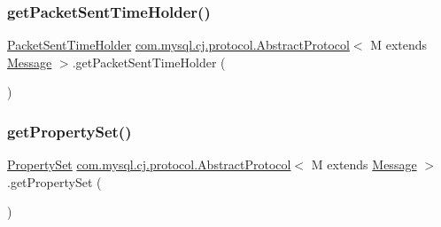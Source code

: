 \mbox{\label{classcom_1_1mysql_1_1cj_1_1protocol_1_1_abstract_protocol_aebcc61f81c539b41f5128d5fe2eee980}} 
\subsubsection{\texorpdfstring{get\+Packet\+Sent\+Time\+Holder()}{getPacketSentTimeHolder()}}
{\footnotesize\ttfamily \mbox{\hyperlink{interfacecom_1_1mysql_1_1cj_1_1protocol_1_1_packet_sent_time_holder}{Packet\+Sent\+Time\+Holder}} \mbox{\hyperlink{classcom_1_1mysql_1_1cj_1_1protocol_1_1_abstract_protocol}{com.\+mysql.\+cj.\+protocol.\+Abstract\+Protocol}}$<$ M extends \mbox{\hyperlink{interfacecom_1_1mysql_1_1cj_1_1protocol_1_1_message}{Message}} $>$.get\+Packet\+Sent\+Time\+Holder (\begin{DoxyParamCaption}{ }\end{DoxyParamCaption})}

\mbox{\label{classcom_1_1mysql_1_1cj_1_1protocol_1_1_abstract_protocol_af644579d6c79c5fce484b19f18ff70aa}} 
\subsubsection{\texorpdfstring{get\+Property\+Set()}{getPropertySet()}}
{\footnotesize\ttfamily \mbox{\hyperlink{interfacecom_1_1mysql_1_1cj_1_1conf_1_1_property_set}{Property\+Set}} \mbox{\hyperlink{classcom_1_1mysql_1_1cj_1_1protocol_1_1_abstract_protocol}{com.\+mysql.\+cj.\+protocol.\+Abstract\+Protocol}}$<$ M extends \mbox{\hyperlink{interfacecom_1_1mysql_1_1cj_1_1protocol_1_1_message}{Message}} $>$.get\+Property\+Set (\begin{DoxyParamCaption}{ }\end{DoxyParamCaption})}

